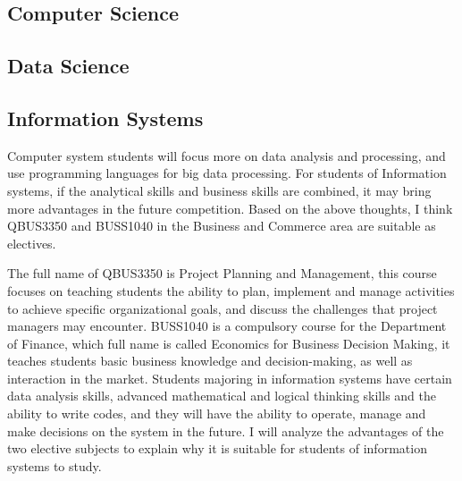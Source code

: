 \documentclass[12pt]{article}
\begin{document}
\subsection{Computer Science}


\subsection{Data Science}


\subsection{Information Systems}

Computer system students will focus more on data analysis and processing, and use programming languages for big data processing. For students of Information systems, if the analytical skills and business skills are combined, it may bring more advantages in the future competition. Based on the above thoughts, I think QBUS3350 and BUSS1040 in the Business and Commerce area are suitable as electives.

The full name of QBUS3350 is Project Planning and Management, this course focuses on teaching students the ability to plan, implement and manage activities to achieve specific organizational goals, and discuss the challenges that project managers may encounter. BUSS1040 is a compulsory course for the Department of Finance, which full name is called Economics for Business Decision Making, it teaches students basic business knowledge and decision-making, as well as interaction in the market. Students majoring in information systems have certain data analysis skills, advanced mathematical and logical thinking skills and the ability to write codes, and they will have the ability to operate, manage and make decisions on the system in the future. I will analyze the advantages of the two elective subjects to explain why it is suitable for students of information systems to study.
\end{document}

